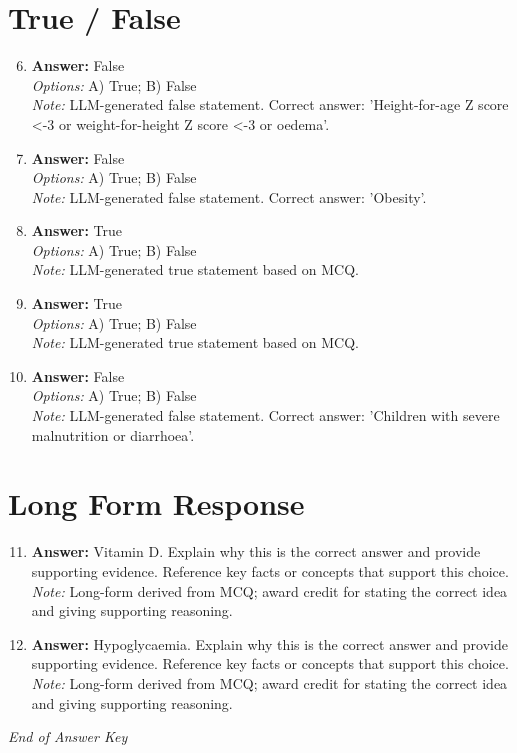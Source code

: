 \documentclass[12pt]{article}
\begin{document}
\section*{True / False}
\begin{enumerate}[label=\arabic*.]
\setcounter{enumi}{5}
\item \textbf{Answer:} False
\\ \textit{Options:} A) True; B) False
\\ \textit{Note:} LLM-generated false statement. Correct answer: 'Height-for-age Z score \textless{}-3 or weight-for-height Z score \textless{}-3 or oedema'.
\item \textbf{Answer:} False
\\ \textit{Options:} A) True; B) False
\\ \textit{Note:} LLM-generated false statement. Correct answer: 'Obesity'.
\item \textbf{Answer:} True
\\ \textit{Options:} A) True; B) False
\\ \textit{Note:} LLM-generated true statement based on MCQ.
\item \textbf{Answer:} True
\\ \textit{Options:} A) True; B) False
\\ \textit{Note:} LLM-generated true statement based on MCQ.
\item \textbf{Answer:} False
\\ \textit{Options:} A) True; B) False
\\ \textit{Note:} LLM-generated false statement. Correct answer: 'Children with severe malnutrition or diarrhoea'.
\end{enumerate}

\section*{Long Form Response}
\begin{enumerate}[label=\arabic*.]
\setcounter{enumi}{10}
\item \textbf{Answer:} Vitamin D. Explain why this is the correct answer and provide supporting evidence. Reference key facts or concepts that support this choice.
\\ \textit{Note:} Long-form derived from MCQ; award credit for stating the correct idea and giving supporting reasoning.
\item \textbf{Answer:} Hypoglycaemia. Explain why this is the correct answer and provide supporting evidence. Reference key facts or concepts that support this choice.
\\ \textit{Note:} Long-form derived from MCQ; award credit for stating the correct idea and giving supporting reasoning.
\end{enumerate}

\vfill
\noindent\textit{End of Answer Key}
\end{document}
